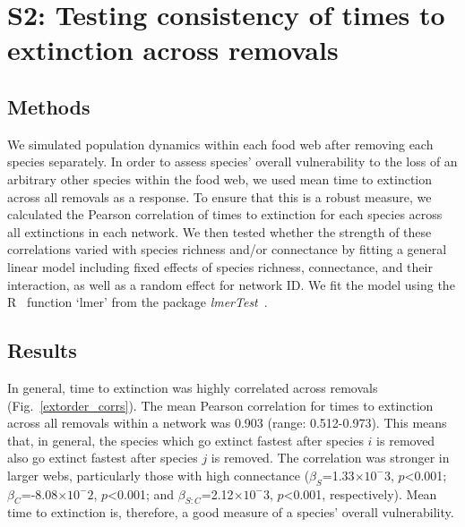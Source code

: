 \documentclass[12pt]{article}
\begin{document}
\clearpage

\section*{S2: Testing consistency of times to extinction across removals}

	\subsection*{Methods}

		We simulated population dynamics within each food web after removing each species separately. 
		In order to assess species' overall vulnerability to the loss of an arbitrary other species within the food web, we used mean time to extinction across all removals as a response. 
		To ensure that this is a robust measure, we calculated the Pearson correlation of times to extinction for each species across all extinctions in each network. 
		We then tested whether the strength of these correlations varied with species richness and/or connectance by fitting a general linear model including fixed effects of species richness, connectance, and their interaction, as well as a random effect for network ID. 
		We fit the model using the R~\citep{R} function `lmer' from the package \emph{lmerTest}~\citep{lmerTest}.


	\subsection*{Results}

		In general, time to extinction was highly correlated across removals (Fig.~\ref{extorder_corrs}). %
		The mean Pearson correlation for times to extinction across all removals within a network was 0.903 (range: 0.512-0.973). %
		This means that, in general, the species which go extinct fastest after species $i$ is removed also go extinct fastest after species $j$ is removed.
		The correlation was stronger in larger webs, particularly those with high connectance ($\beta_{S}$=1.33$\times10^-3$, $p$\textless0.001; $\beta_{C}$=-8.08$\times10^-2$, $p$\textless0.001; and $\beta_{S:C}$=2.12$\times10^-3$, $p$\textless0.001, respectively). 
		Mean time to extinction is, therefore, a good measure of a species' overall vulnerability.
\end{document}
